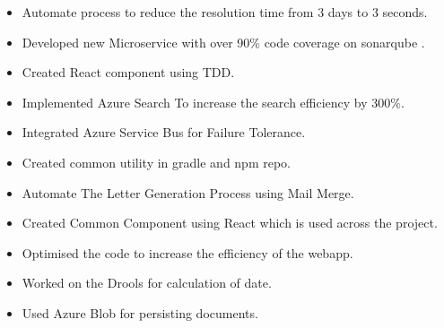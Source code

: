 \documentclass[10pt,a4paper]{altacv}
\begin{document}
    \begin{fullwidth}
    \makecvheader
    \end{fullwidth}
        \begin{itemize}
            \item Automate process to reduce the resolution time from 3 days to 3 seconds. 
            \item Developed new Microservice with over 90\% code coverage on sonarqube .  
            \item Created React component using TDD.
            \item Implemented Azure Search To increase the search efficiency by 300\%.
            \item Integrated Azure Service Bus for Failure Tolerance.
            \item Created common utility in gradle and npm repo.
            \end{itemize}
            \divider
            \begin{itemize}
            \item Automate The Letter Generation Process using Mail Merge. 
            \item Created Common Component using React which is used across the project.  
            \item Optimised the code to increase the efficiency of the webapp. 
            \item Worked on the Drools for calculation of date.  
            \item Used Azure Blob for persisting documents.
        \end{itemize}
\end{document}
